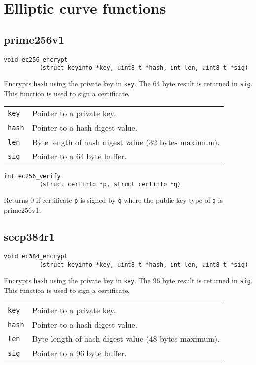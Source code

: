 \documentclass[12pt]{article}
\begin{document}
\newpage
\section{Elliptic curve functions}

\subsection{prime256v1}

\bigskip
\bigskip
\begin{verbatim}
void ec256_encrypt
          (struct keyinfo *key, uint8_t *hash, int len, uint8_t *sig)
\end{verbatim}

\noindent
Encrypts {\tt hash} using the private key in {\tt key}.
The 64 byte result is returned in {\tt sig}.
This function is used to sign a certificate.

\bigskip
\begin{tabular}{ll}
{\tt key} & Pointer to a private key.\\
{\tt hash} & Pointer to a hash digest value.\\
{\tt len} & Byte length of hash digest value (32 bytes maximum).\\
{\tt sig} & Pointer to a 64 byte buffer.
\end{tabular}

\bigskip
\bigskip
\begin{verbatim}
int ec256_verify
          (struct certinfo *p, struct certinfo *q)
\end{verbatim}

\noindent
Returns 0 if certificate {\tt p} is signed by {\tt q}
where the public key type of {\tt q} is prime256v1.

\bigskip
\subsection{secp384r1}

\bigskip
\bigskip
\begin{verbatim}
void ec384_encrypt
          (struct keyinfo *key, uint8_t *hash, int len, uint8_t *sig)
\end{verbatim}

\noindent
Encrypts {\tt hash} using the private key in {\tt key}.
The 96 byte result is returned in {\tt sig}.
This function is used to sign a certificate.

\bigskip
\begin{tabular}{ll}
{\tt key} & Pointer to a private key.\\
{\tt hash} & Pointer to a hash digest value.\\
{\tt len} & Byte length of hash digest value (48 bytes maximum).\\
{\tt sig} & Pointer to a 96 byte buffer.
\end{tabular}
\end{document}
